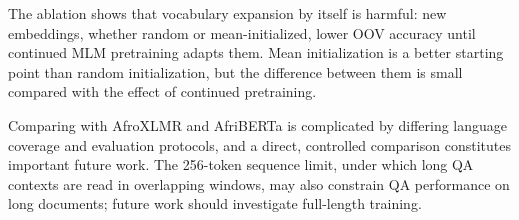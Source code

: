 The ablation shows that vocabulary expansion by itself is harmful: new embeddings, whether random or mean-initialized, lower OOV accuracy until continued MLM pretraining adapts them. Mean initialization is a better starting point than random initialization, but the difference between them is small compared with the effect of continued pretraining.

Comparing with AfroXLMR and AfriBERTa is complicated by differing language coverage and evaluation protocols, and a direct, controlled comparison constitutes important future work. The 256-token sequence limit, under which long QA contexts are read in overlapping windows, may also constrain QA performance on long documents; future work should investigate full-length training.
